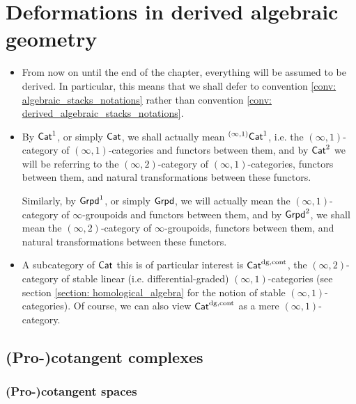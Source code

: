     \section{Deformations in derived algebraic geometry}
        \begin{convention} \label{conv: deformation_theory_everything_is_derived}
            \noindent
            \begin{itemize}
                \item From now on until the end of the chapter, everything will be assumed to be derived. In particular, this means that we shall defer to convention \ref{conv: algebraic_stacks_notations} rather than convention \ref{conv: derived_algebraic_stacks_notations}.
                \item By $\mathsf{Cat}^1$, or simply $\mathsf{Cat}$, we shall actually mean ${}^{(\infty, 1)}\mathsf{Cat}^1$, i.e. the $(\infty, 1)$-category of $(\infty, 1)$-categories and functors between them, and by $\mathsf{Cat}^2$ we will be referring to the $(\infty, 2)$-category of $(\infty, 1)$-categories, functors between them, and natural transformations between these functors. 
                
                Similarly, by $\mathsf{Grpd}^1$, or simply $\mathsf{Grpd}$, we will actually mean the $(\infty, 1)$-category of $\infty$-groupoids and functors between them, and by $\mathsf{Grpd}^2$, we shall mean the $(\infty, 2)$-category of $\infty$-groupoids, functors between them, and natural transformations between these functors.
                \item A subcategory of $\mathsf{Cat}$ this is of particular interest is $\mathsf{Cat}^{\mathrm{dg}, \mathrm{cont}}$, the $(\infty, 2)$-category of stable linear (i.e. differential-graded) $(\infty, 1)$-categories (see section \ref{section: homological_algebra} for the notion of stable $(\infty, 1)$-categories). Of course, we can also view $\mathsf{Cat}^{\mathrm{dg}, \mathrm{cont}}$ as a mere $(\infty, 1)$-category.
            \end{itemize}
        \end{convention}
    
        \subsection{(Pro-)cotangent complexes}
            \subsubsection{(Pro-)cotangent spaces}
            

